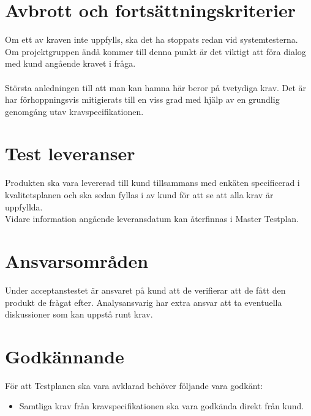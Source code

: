 \documentclass[10pt]{article}
\begin{document}
\section{Avbrott och fortsättningskriterier}
	Om ett av kraven inte uppfylls, ska det ha stoppats redan vid systemtesterna. Om projektgruppen ändå kommer till denna punkt är det viktigt att föra dialog med kund angående kravet i fråga.\\
	\\
	Största anledningen till att man kan hamna här beror på tvetydiga krav. Det är har förhoppningsvis mitigierats till en viss grad med hjälp av en grundlig genomgång utav kravspecifikationen.


\section{Test leveranser }
	Produkten ska vara levererad till kund tillsammans med enkäten specificerad i kvalitetsplanen och ska sedan fyllas i av kund för att se att alla krav är uppfyllda.
\\	
	Vidare information angående leveransdatum kan återfinnas i Master Testplan.
	

	
\section{Ansvarsområden}
	Under acceptanstestet är ansvaret på kund att de verifierar att de fått den produkt de frågat efter. Analysansvarig har extra ansvar att ta eventuella diskussioner som kan uppstå runt krav.
	

	

	
	
\section{Godkännande}
	För att Testplanen ska vara avklarad behöver följande vara godkänt:
	\begin{itemize}
	 \item Samtliga krav från kravspecifikationen ska vara godkända direkt från kund.
	\end{itemize}
	


\printbibliography
\end{document}
